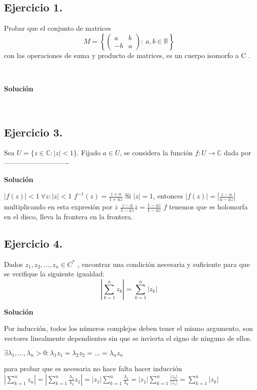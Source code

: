 \subsection{Ejercicio 1.} Probar que el conjunto de matrices
$$ M = \left\{ 
	\left( \begin{array}{cc}
	 a & b \\
	-b & a \end{array} \right)
	 : \ a, b\in \mathbb{R}\right\} $$
con las operaciones de suma y producto de matrices, es un cuerpo isomorfo a C .

\

\textbf{Solución}

\





\subsection{Ejercicio 3.}
Sea $U=\{ z\in\mathbb{C} : |z|<1 \}$.
Fijado $a \in U$, se considera la función $f: U\rightarrow\mathbb{C}$ dada por
----------------------------


\textbf{Solución}

$|f(z)| < 1 \ \forall z : |z| <1$
$f^{-1}(z)= \frac{z+a}{1+\overline{a}z}$
Si $|z|=1$, entonces $|f(z)| = |\frac{z-a}{a-\overline{a}z}|$
multiplicando en esta expresión por $\overline{z}$
$ \frac{z-a}{1-\overline{a}z} \overline{z}  =  \frac{1-a\overline{z}}{1-\overline{a}z}$
$f$ tenemos que es holomorfa en el disco, lleva la frontera en la frontera.



\subsection{Ejercicio 4.}
Dados $z_1, z_2, . . . , z_n \in C^{\ast}$ , encontrar una condición necesaria y suficiente para que se
verifique la siguiente igualdad:
$$ |\sum_{k=1}^n z_k| = \sum_{k=1}^n |z_k|$$

\textbf{Solución}

Por inducción, todos los números complejos deben tener el mismo argumento, son vectores linealmente dependientes sin que se invierta el signo de ninguno de ellos.

$\exists\lambda_1,...,\lambda_n>0 : \lambda_1 z_1 = \lambda_2 z_2 = ... = \lambda_n z_n$

para probar que es necesaria no hace falta hacer inducción
$ |\sum_{k=1}^n z_n| = |\sum_{k=1}^n \frac{\lambda_1}{\lambda_k} z_1| 
=
|z_1|\sum_{k=1}^n \frac{\lambda_1}{\lambda_k} 
=
|z_1|\sum_{k=1}^n \frac{|z_k|}{|z_1|} 
=
\sum_{k=1}^n |z_k|$

